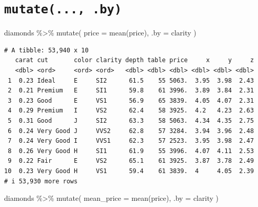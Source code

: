 \documentclass[
  letterpaper,
]{ctexbook}
\newenvironment{Shaded}{\begin{snugshade}}{\end{snugshade}}
\newcommand{\AttributeTok}[1]{\textcolor[rgb]{0.40,0.45,0.13}{#1}}
\newcommand{\FunctionTok}[1]{\textcolor[rgb]{0.28,0.35,0.67}{#1}}
\newcommand{\NormalTok}[1]{\textcolor[rgb]{0.00,0.23,0.31}{#1}}
\newcommand{\SpecialCharTok}[1]{\textcolor[rgb]{0.37,0.37,0.37}{#1}}
\begin{document}
\hypertarget{mutate...-.by}{%
\section{\texorpdfstring{\texttt{mutate(...,\ .by)}}{mutate(..., .by)}}\label{mutate...-.by}}

\begin{Shaded}
\begin{Highlighting}[]
\NormalTok{diamonds }\SpecialCharTok{\%\textgreater{}\%}
  \FunctionTok{mutate}\NormalTok{(}
    \AttributeTok{price =} \FunctionTok{mean}\NormalTok{(price),}
    \AttributeTok{.by =}\NormalTok{ clarity}
\NormalTok{  )}
\end{Highlighting}
\end{Shaded}

\begin{verbatim}
# A tibble: 53,940 x 10
   carat cut       color clarity depth table price     x     y     z
   <dbl> <ord>     <ord> <ord>   <dbl> <dbl> <dbl> <dbl> <dbl> <dbl>
 1  0.23 Ideal     E     SI2      61.5    55 5063.  3.95  3.98  2.43
 2  0.21 Premium   E     SI1      59.8    61 3996.  3.89  3.84  2.31
 3  0.23 Good      E     VS1      56.9    65 3839.  4.05  4.07  2.31
 4  0.29 Premium   I     VS2      62.4    58 3925.  4.2   4.23  2.63
 5  0.31 Good      J     SI2      63.3    58 5063.  4.34  4.35  2.75
 6  0.24 Very Good J     VVS2     62.8    57 3284.  3.94  3.96  2.48
 7  0.24 Very Good I     VVS1     62.3    57 2523.  3.95  3.98  2.47
 8  0.26 Very Good H     SI1      61.9    55 3996.  4.07  4.11  2.53
 9  0.22 Fair      E     VS2      65.1    61 3925.  3.87  3.78  2.49
10  0.23 Very Good H     VS1      59.4    61 3839.  4     4.05  2.39
# i 53,930 more rows
\end{verbatim}

\begin{Shaded}
\begin{Highlighting}[]
\NormalTok{diamonds }\SpecialCharTok{\%\textgreater{}\%}
  \FunctionTok{mutate}\NormalTok{(}
    \AttributeTok{mean\_price =} \FunctionTok{mean}\NormalTok{(price),}
    \AttributeTok{.by =}\NormalTok{ clarity}
\NormalTok{  )}
\end{Highlighting}
\end{Shaded}
\end{document}
